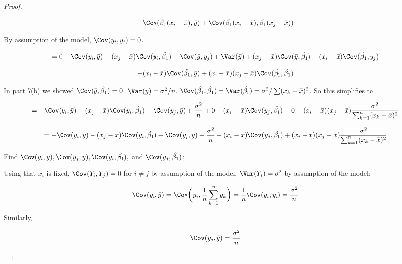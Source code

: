 \begin{proof}
\begin{enumerate}[(a)]
\[
+ \Cov(\hat{\beta_1}(x_i - \bar{x}), \bar{y}) + \Cov(\hat{\beta_1}(x_i - \bar{x}), \hat{\beta_1}(x_j - \bar{x}))
\]

By assumption of the model, \(\Cov(y_i, y_j) = 0\). 

\[
 = 0 - \Cov(y_i, \bar{y}) - ( x_j - \bar{x} )\Cov(y_i, \hat{\beta_1} )  - \Cov(\bar{y}, y_j)  + \Var(\bar{y}) + (x_j - \bar{x}) \Cov(\bar{y}, \hat{\beta_1}) -  (x_i - \bar{x}) \Cov(\hat{\beta_1}, y_j)   
\]

\[
+ (x_i  - \bar{x}) \Cov(\hat{\beta_1} , \bar{y} ) + (x_i - \bar{x})(x_j - \bar{x})\Cov(\hat{\beta_1}, \hat{\beta_1})
\]


In part 7(b) we showed \( \Cov(\bar{y}, \hat{\beta_1}) = 0 \). \(\Var(\bar{y}) = \sigma^2/n\). \(\Cov(\hat{\beta_1}, \hat{\beta_1}) = \Var(\hat{\beta_1}) = \sigma^2/\sum(x_k - \bar{x})^2\). So this simplifies to 

\[
 = - \Cov(y_i, \bar{y}) - ( x_j - \bar{x})\Cov(y_i, \hat{\beta_1} ) - \Cov(y_j, \bar{y}) + \frac{\sigma^2}{n} + 0 - ( x_i - \bar{x})\Cov(y_j, \hat{\beta_1} ) + 0 + (x_i - \bar{x})(x_j - \bar{x})\frac{\sigma^2}{\sum_{k=1}^n(x_k - \bar{x})^2}
\]

\begin{equation} \label{linreg.100b.hw5.8}
 =- \Cov(y_i, \bar{y}) - ( x_j - \bar{x})\Cov(y_i, \hat{\beta_1} ) - \Cov(y_j, \bar{y}) + \frac{\sigma^2}{n} - ( x_i - \bar{x})\Cov(y_j, \hat{\beta_1} ) + (x_i - \bar{x})(x_j - \bar{x})\frac{\sigma^2}{\sum_{k=1}^n(x_k - \bar{x})^2}
\end{equation}

Find \(\Cov(y_i, \bar{y}), \Cov(y_j, \bar{y}), \Cov(y_i, \hat{\beta_1} ), \) and \(\Cov(y_j, \hat{\beta_1} )\):




Using that \(x_i\) is fixed, \(\Cov(Y_i, Y_j) = 0 \) for \(i \neq j\) by assumption of the model, \(\Var(Y_i) = \sigma^2\) by assumption of the model:

\[
\Cov(y_i, \bar{y}) = \Cov\bigg(y_i, \frac{1}{n}\sum_{k=1}^n y_k  \bigg) = \frac{1}{n} \Cov(y_i, y_i) = \frac{\sigma^2}{n}
\]

Similarly, 

\[
\Cov(y_j, \bar{y})  = \frac{\sigma^2}{n}
\]


\end{enumerate}
\end{proof}
